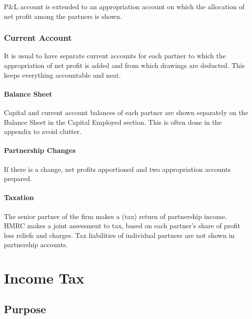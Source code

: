 \documentclass[
]{article}
\begin{document}
P\&L account is extended to an appropriation account on which the
allocation of net profit among the partners is shown.

\hypertarget{current-account}{%
\subsubsection{Current Account}\label{current-account}}

It is usual to have separate current accounts for each partner to which
the appropriation of net profit is added and from which drawings are
deducted. This keeps everything accountable and neat.

\hypertarget{balance-sheet-1}{%
\paragraph{Balance Sheet}\label{balance-sheet-1}}

Capital and current account balances of each partner are shown
separately on the Balance Sheet in the Capital Employed section. This is
often done in the appendix to avoid clutter.

\hypertarget{partnership-changes}{%
\paragraph{Partnership Changes}\label{partnership-changes}}

If there is a change, net profits apportioned and two appropriation
accounts prepared.

\hypertarget{taxation}{%
\paragraph{Taxation}\label{taxation}}

The senior partner of the firm makes a (tax) return of partnership
income. HMRC makes a joint assessment to tax, based on each partner's
share of profit less reliefs and charges. Tax liabilities of individual
partners are not shown in partnership accounts.

\hypertarget{income-tax}{%
\section{Income Tax}\label{income-tax}}

\hypertarget{purpose}{%
\subsection{Purpose}\label{purpose}}
\end{document}
